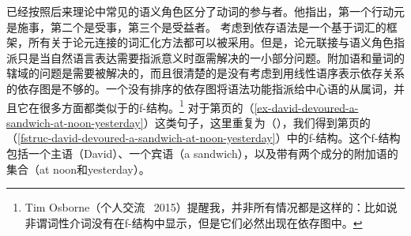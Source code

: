 \tes 已经按照后来理论中常见的语义角色区分了动词的参与者。他指出，第一个行动元是施事，第二个是受事，第三个是受益者\citep[\S~106]{Tesniere2015a-not-crossreferenced}。
考虑到依存语法是一个基于词汇的框架，所有关于论元连接的词汇化方法都可以被采用。但是，论元联接与语义角色指派只是当自然语言表达需要指派意义时亟需解决的一小部分问题。附加语和量词的辖域的问题是需要被解决的，而且很清楚的是没有考虑到用线性语序表示依存关系的依存图是不够的。一个没有排序的依存图将语法功能指派给中心语的从属词，并且它在很多方面都类似于\lfgc 的f-结构。\footnote{%
Tim Osborne（个人交流 \, 2015）提醒我，并非所有情况都是这样的：比如说非谓词性介词没有在f-结构中显示，但是它们必然出现在依存图中。
} 对于第\pageref{ex-david-devoured-a-sandwich-at-noon-yesterday}页的（\ref{ex-david-devoured-a-sandwich-at-noon-yesterday}）这类句子，这里重复为（），我们得到第\pageref{fstruc-david-devoured-a-sandwich-at-noon-yesterday}页的（\ref{fstruc-david-devoured-a-sandwich-at-noon-yesterday}）中的f-结构。这个f-结构包括一个主语（David）、一个宾语（a sandwich），以及带有两个成分的附加语的集合（at noon和yesterday）。
